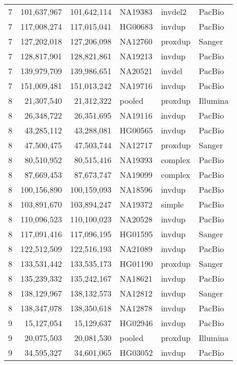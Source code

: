 {\begin{longtable}{rrrlll}
    7   & 101,637,967 & 101,642,114 & NA19383 & invdel2 & PacBio  \\
    7   & 117,008,274 & 117,015,041 & HG00683 & invdup  & PacBio  \\
    7   & 127,202,018 & 127,206,098 & NA12760 & proxdup & Sanger  \\
    7   & 128,817,901 & 128,821,861 & NA19213 & invdup  & PacBio  \\
    7   & 139,979,709 & 139,986,651 & NA20521 & invdel  & PacBio  \\
    7   & 151,009,481 & 151,013,242 & NA19716 & invdup  & PacBio  \\
    8   & 21,307,540  & 21,312,322  & pooled  & proxdup & Illumina  \\
    8   & 26,348,722  & 26,351,695  & NA19116 & invdup  & PacBio  \\
    8   & 43,285,112  & 43,288,081  & HG00565 & invdup  & PacBio  \\
    8   & 47,500,475  & 47,503,744  & NA12717 & proxdup & Sanger  \\
    8   & 80,510,952  & 80,515,416  & NA19393 & complex & PacBio  \\
    8   & 87,669,453  & 87,673,747  & NA19099 & complex & PacBio  \\
    8   & 100,156,890 & 100,159,093 & NA18596 & invdup  & PacBio  \\
    8   & 103,891,670 & 103,894,247 & NA19372 & simple  & PacBio  \\
    8   & 110,096,523 & 110,100,023 & NA20528 & invdup  & PacBio  \\
    8   & 117,091,416 & 117,096,195 & HG01595 & invdup  & Sanger  \\
    8   & 122,512,509 & 122,516,193 & NA21089 & invdup  & PacBio  \\
    8   & 133,531,442 & 133,535,173 & HG01190 & proxdup & Sanger  \\
    8   & 135,239,332 & 135,242,167 & NA18621 & invdup  & PacBio  \\
    8   & 138,129,967 & 138,132,573 & NA12812 & invdup  & Sanger  \\
    8   & 138,347,078 & 138,350,618 & NA12878 & invdup  & PacBio  \\
    9   & 15,127,054  & 15,129,637  & HG02946 & invdup  & PacBio  \\
    9   & 20,075,503  & 20,081,530  & pooled  & proxdup & Illumina  \\
    9   & 34,595,327  & 34,601,065  & HG03052 & invdup  & PacBio  \\

\end{longtable}}
